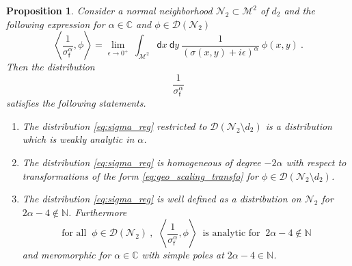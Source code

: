 \documentclass[11pt]{book}
\newcommand{\sm}[1]{\left\langle#1\right\rangle}
\newcommand{\Dcal}{\mathcal{D}}
\newcommand{\Mcal}{\mathcal{M}}
\newcommand{\Ncal}{\mathcal{N}}
\newcommand{\Cbb}{\mathbb{C}}
\newcommand{\Nbb}{\mathbb{N}}
\newcommand{\dsf}{\mathsf{d}}
\newcommand{\fsf}{\mathsf{f}}
\theoremstyle{break}
\newtheorem{proposition}{Proposition}[chapter]
\begin{document}
\begin{proposition}\label{prop:sigma_1}
Consider a normal neighborhood $\Ncal_2 \subset\Mcal^2$ of $d_2$ and the following expression for $\alpha \in \Cbb$ and $\phi \in \Dcal(\Ncal_2)$
%
\begin{equation*}
\sm{ \frac{1}{\sigma^\alpha_\fsf} , \phi } = \lim_{\epsilon \to 0^+ } \ \int_{\Mcal^2} \dsf x \ \dsf y \ \frac{1}{(\sigma(x,y)+i\epsilon)^{\alpha}} \ \phi(x,y) \ .
\end{equation*}
%
Then the distribution
%
\begin{equation}
\frac{1}{\sigma_\fsf^\alpha}
\label{eq:sigma_reg}
\end{equation}
%
satisfies the following statements.
%
\begin{enumerate}
%
\item\label{item:1_sigma_1} The distribution \eqref{eq:sigma_reg} restricted to $\Dcal(\Ncal_2 \setminus d_2)$ is a distribution which is weakly analytic in $\alpha$.
%
\item\label{item:2_sigma_1} The distribution \eqref{eq:sigma_reg} is homogeneous of degree $-2\alpha$ with respect to transformations of the form \eqref{eq:geo_scaling_transfo} for $\phi \in \Dcal(\Ncal_2\setminus d_2)$.
%
\item\label{item:3_sigma_1} The distribution \eqref{eq:sigma_reg} is well defined as a distribution on $\Ncal_2$ for $2\alpha-4 \notin \Nbb$. Furthermore
%
\begin{equation*}
\mbox{for all } \ \phi \in \Dcal(\Ncal_2) \ , \ \ \sm{ \frac{1}{\sigma^\alpha_\fsf} , \phi } \ \mbox{ is analytic for } \ 2\alpha-4\notin \Nbb 
\end{equation*}
%
and meromorphic for $\alpha \in \Cbb$ with simple poles at $2\alpha-4\in \mathbb{N}$. 
%
\end{enumerate}
%
\end{proposition}
\end{document}

